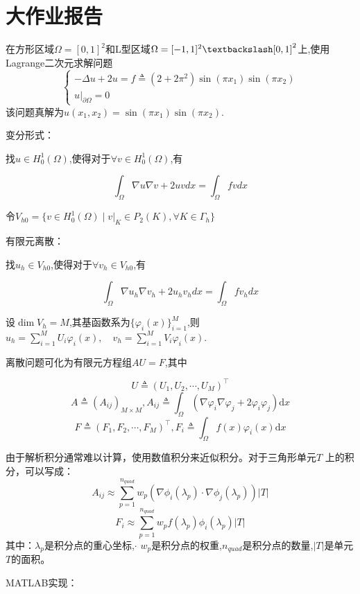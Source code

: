 \documentclass[12pt,a4paper]{article}
\begin{document}
	
	\section*{大作业报告}
	
	在方形区域$\Omega=[0,1]^2$和L型区域$\Omega=[-1,1]^2 \textbackslash [0,1]^2 $上,使用Lagrange二次元求解问题
	$$\begin{cases}-\Delta u+2u=f\triangleq(2+2\pi^2)\sin(\pi x_1)\sin(\pi x_2)\\u|_{\partial\Omega}=0\end{cases}$$
	该问题真解为$u(x_1,x_2)=\sin(\pi x_1)\sin(\pi x_2)$.
	
	变分形式：
	
	找$u \in H_0^1(\Omega)$,使得对于$\forall v \in H_0^1(\Omega)$,有
	
	$$
	\int_\Omega \nabla u \nabla v + 2uv dx= \int_\Omega fv dx
	$$
	
	令$V_{h0}=\{v\in H_0^1(\Omega)\mid v|_K\in P_2(K),\forall K\in \Gamma_h\}$
	
	有限元离散：
		
	找$u_h \in V_{h0}$,使得对于$\forall v_h \in V_{h0}$,有
	
	$$
	\int_\Omega \nabla u_h \nabla v_h + 2u_h v_h dx= \int_\Omega fv_h dx
	$$
	
	设$\dim V_h = M$,其基函数系为$\{\varphi_i(x)\}_{i=1}^M$,则$u_h=\sum_{i=1}^MU_i\varphi_i(x),\quad v_h=\sum_{i=1}^MV_i\varphi_i(x).$
	
	离散问题可化为有限元方程组$AU=F$,其中
	
	$$U \triangleq (U_1,U_2,\cdots,U_M)^\top$$
	$$A\triangleq\left(A_{ij}\right)_{M\times M},A_{ij}\triangleq \int_\Omega \left(\nabla \varphi_{i} \nabla \varphi_{j}+2\varphi_{i}\varphi_{j}\right)\mathrm{d}x$$
	$$F\triangleq\left(F_{1},F_{2},\cdots,F_{M}\right)^{\top},F_{i}\triangleq \int_{\Omega} f(x)\varphi_{i}(x)\mathrm{d}x$$
	
	由于解析积分通常难以计算，使用数值积分来近似积分。对于三角形单元$T$ 上的积分，可以写成：
	$$A_{ij}\approx\sum_{p=1}^{n_{quad}}w_p(\nabla\phi_i(\lambda_p)\cdot\nabla\phi_j(\lambda_p))|T|$$
	$$F_i\approx\sum_{p=1}^{n_{quad}}w_pf(\lambda_p)\phi_i(\lambda_p)|T|$$
	其中：$\lambda_p$是积分点的重心坐标,$\cdot$ $w_p$是积分点的权重,$n_{quad}$是积分点的数量,$|T|$是单元$T$的面积。
	
	MATLAB实现：
	
\end{document}
